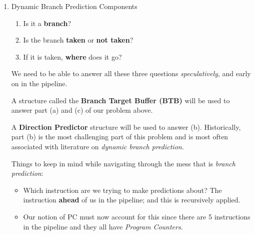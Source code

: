 \documentclass[12pt]{article}
\newenvironment{QandA}{\begin{enumerate}[label=\bfseries\arabic*.]\bfseries}
                      {\end{enumerate}}
\newenvironment{answered}{\par\quad\normalfont}{}
\begin{document}
\begin{QandA}
\begin{answered}
    \textit{Dynamic Branch Prediction Performance:}

    Instructions are Branch: 20\%, Load: 20\%, Store: 10\%, Other: 50\%. 75\% of \textit{Branch Instructions} are taken. \textbf{Branch targets are predicted with 95\% accuracy}. What is the CPI?
    
    \begin{equation*}
        CPI = 1 + 20\% \times 5\% \times \textbf{2}
    \end{equation*}
    \begin{equation*}
        CPI = 1 + 0.20 \times 0.05 \times \textbf{2} = 1.02
    \end{equation*}

    In this case, \textit{Branch Instructions} will cause a 2\% slow-down. This is significantly better than the previous na\"ive approach. 
\end{answered}

\item Dynamic Branch Prediction Components
\vspace{-0.85cm}
\begin{answered}
\begin{enumerate}
    \item Is it a \textbf{branch}?
    \item Is the branch \textbf{taken} or \textbf{not taken}?
    \item If it is taken, \textbf{where} does it go?
\end{enumerate}
We need to be able to answer all these three questions \textit{speculatively}, and early on in the pipeline.

A structure called the \textbf{Branch Target Buffer (BTB)} will be used to answer part (a) and (c) of our problem above. 

A \textbf{Direction Predictor} structure will be used to answer (b). Historically, part (b) is the most challenging part of this problem and is most often associated with literature on \textit{dynamic branch prediction}.

Things to keep in mind while navigating through the mess that is \textit{branch prediction}:
\begin{itemize}
    \item Which instruction are we trying to make predictions about? The instruction \textbf{ahead} of us in the pipeline; and this is recursively applied. 
    \item Our notion of PC must now account for this since there are 5 instructions in the pipeline and they all have \textit{Program Counters}. 
\end{itemize}


\end{answered}
\end{QandA}
\end{document}
